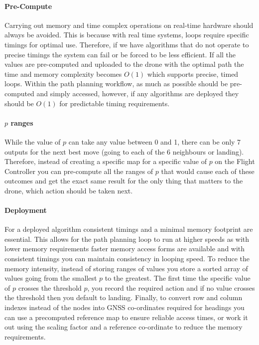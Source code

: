\paragraph{Pre-Compute}
Carrying out memory and time complex operations on real-time hardware should always be avoided. This is because with real time systems, loops require specific timings for optimal use. Therefore, if we have algorithms that do not operate to precise timings the system can fail or be forced to be less efficient. If all the values are pre-computed and uploaded to the drone with the optimal path the time and memory complexity becomes $O(1)$ which supports precise, timed loops. Within the path planning workflow, as much as possible should be pre-computed and simply accessed, however, if any algorithms are deployed they should be $O(1)$ for predictable timing requirements.
\paragraph{$p$ ranges}
While the value of $p$ can take any value between 0 and 1, there can be only 7 outputs for the next best move (going to each of the 6 neighbours or landing). Therefore, instead of creating a specific map for a specific value of $p$ on the Flight Controller you can pre-compute all the ranges of $p$ that would cause each of these outcomes and get the exact same result for the only thing that matters to the drone, which action should be taken next.
\paragraph{Deployment}
For a deployed algorithm consistent timings and a minimal memory footprint are essential. This allows for the path planning loop to run at higher speeds as with lower memory requirements faster memory access forms are available and with consistent timings you can maintain consistency in looping speed. To reduce the memory intensity, instead of storing ranges of values you store a sorted array of values going from the smallest $p$ to the greatest. The first time the specific value of $p$ crosses the threshold $p$, you record the required action and if no value crosses the threshold then you default to landing. Finally, to convert row and column indexes instead of the nodes into \gls{GNSS} co-ordinates required for headings you can use a precomputed reference map to ensure reliable access times, or work it out using the scaling factor and a reference co-ordinate to reduce the memory requirements.

